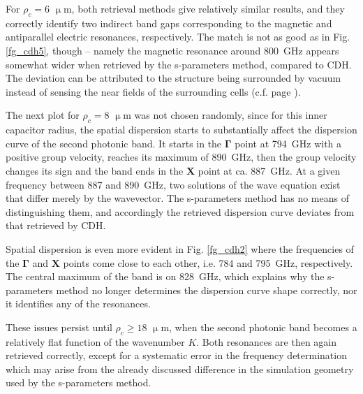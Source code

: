 For $\rho_c=6$ $\upmu$m, both retrieval methods give relatively similar results, and they correctly identify two indirect band gaps corresponding to the magnetic and antiparallel electric resonances, respectively. The match is not as good as in Fig. \ref{fg_cdh5}, though -- namely the magnetic resonance around 800~GHz appears somewhat wider when retrieved by the s-parameters method, compared to CDH. The deviation can be attributed to the structure being surrounded by vacuum instead of sensing the near fields of the surrounding cells (c.f. page \pageref{cdhadvantages}).

The next plot for $\rho_c=8$ $\upmu$m was not chosen randomly, since for this inner capacitor radius, the spatial dispersion starts to substantially affect the dispersion curve of the second photonic band. It starts in the $\mathbf \Gamma$ point at 794~GHz with a positive group velocity, reaches its maximum of 890~GHz, then the group velocity changes its sign and the band ends in the $\mathbf X$ point at ca. 887~GHz. At a given frequency between 887 and 890~GHz, two solutions of the wave equation exist that differ merely by the wavevector. The s-parameters method has no means of distinguishing them, and accordingly the retrieved dispersion curve deviates from that retrieved by CDH.

Spatial dispersion is even more evident in Fig. \ref{fg_cdh2} where the frequencies of the $\mathbf \Gamma$ and $\mathbf X$ points come close to each other, i.e. 784 and 795~GHz, respectively. The central maximum of the band is on 828~GHz, which explains why the s-parameters	method no longer determines the dispersion curve shape correctly, nor it identifies any of the resonances.

These issues persist until $\rho_c \geq 18$ $\upmu$m, when the second photonic band becomes a relatively flat function of the wavenumber $K$. Both resonances are then again retrieved correctly, except for a systematic error in the frequency determination which may arise from the already discussed difference in the simulation geometry used by the s-parameters method.

